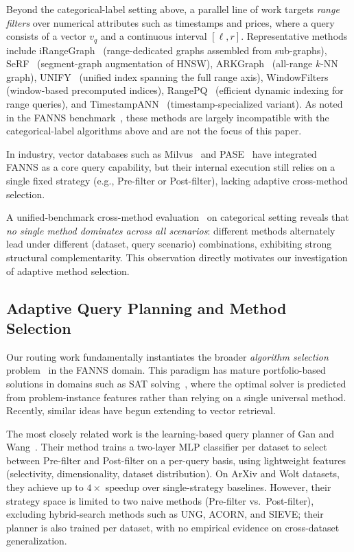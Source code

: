Beyond the categorical-label setting above, a parallel line of work targets \emph{range filters} over numerical attributes such as timestamps and prices, where a query consists of a vector $v_q$ and a continuous interval $[\ell, r]$. Representative methods include iRangeGraph~\cite{iRangeGraph2024} (range-dedicated graphs assembled from sub-graphs), SeRF~\cite{SeRF2024} (segment-graph augmentation of HNSW), ARKGraph~\cite{ARKGraph2023} (all-range $k$-NN graph), UNIFY~\cite{UNIFY2025} (unified index spanning the full range axis), WindowFilters~\cite{WindowFilters2024} (window-based precomputed indices), RangePQ~\cite{RangePQ2025} (efficient dynamic indexing for range queries), and TimestampANN~\cite{TimestampANN2025} (timestamp-specialized variant). As noted in the FANNS benchmark~\cite{FilteredANNBenchmark2024}, these methods are largely incompatible with the categorical-label algorithms above and are not the focus of this paper.

In industry, vector databases such as Milvus~\cite{Milvus2021} and PASE~\cite{PASE2020} have integrated FANNS as a core query capability, but their internal execution still relies on a single fixed strategy (e.g., Pre-filter or Post-filter), lacking adaptive cross-method selection.

A unified-benchmark cross-method evaluation~\cite{FilteredANNBenchmark2024} on categorical setting reveals that \emph{no single method dominates across all scenarios}: different methods alternately lead under different (dataset, query scenario) combinations, exhibiting strong structural complementarity. This observation directly motivates our investigation of adaptive method selection.

\subsection{Adaptive Query Planning and Method Selection}
\label{sec:rw-routing}

Our routing work fundamentally instantiates the broader \emph{algorithm selection} problem~\cite{Rice1976} in the FANNS domain. This paradigm has mature portfolio-based solutions in domains such as SAT solving~\cite{SATzilla2008}, where the optimal solver is predicted from problem-instance features rather than relying on a single universal method. Recently, similar ideas have begun extending to vector retrieval.

The most closely related work is the learning-based query planner of Gan and Wang~\cite{LearningBasedQueryPlanning2026}. Their method trains a two-layer MLP classifier per dataset to select between Pre-filter and Post-filter on a per-query basis, using lightweight features (selectivity, dimensionality, dataset distribution). On ArXiv and Wolt datasets, they achieve up to $4\times$ speedup over single-strategy baselines. However, their strategy space is limited to two naive methods (Pre-filter vs.\ Post-filter), excluding hybrid-search methods such as UNG, ACORN, and SIEVE; their planner is also trained per dataset, with no empirical evidence on cross-dataset generalization.

